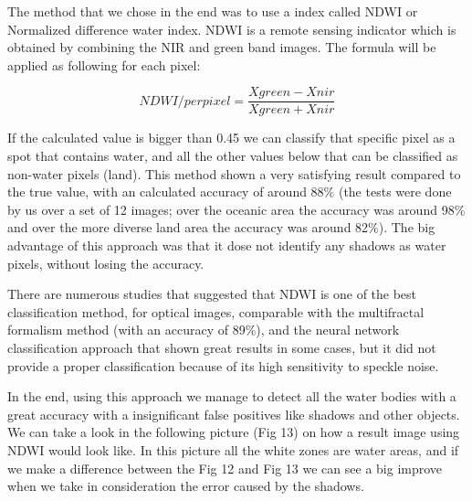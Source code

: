 \documentclass[12pt, a4paper]{report}
\begin{document}
The method that we chose in the end was to use a index called NDWI or Normalized difference water index. NDWI is a remote sensing indicator which is obtained by combining the NIR and green band images. The formula will be applied as following for each pixel:

$$ NDWI/perpixel = \frac{Xgreen - Xnir}{Xgreen + Xnir}$$

If the calculated value is bigger than 0.45 we can classify that specific pixel as a spot that contains water, and all the other values below that can be classified as non-water pixels (land). This method shown a very satisfying result compared to the true value, with an calculated accuracy of around 88\% (the tests were done by us over a set of 12 images; over the oceanic area the accuracy was around 98\% and over the more diverse land area the accuracy was around 82\%). The big advantage of this approach was that it dose not identify any shadows as water pixels, without losing the accuracy. 
\par 
There are numerous studies \cite{NDWI, NDWI Comparison} that suggested that NDWI is one of the best classification method, for optical images, comparable with the multifractal formalism method (with an accuracy of 89\%), and the neural network classification approach that shown great results in some cases, but it did not provide a proper classification because of its high sensitivity to speckle noise.
\par 

In the end, using this approach we manage to detect all the water bodies with a great accuracy with a insignificant false positives like shadows and other objects. We can take a look in the following picture (Fig 13) on how a result image using NDWI would look like. In this picture all the white zones are water areas, and if we make a difference between the Fig 12 and Fig 13 we can see a big improve when we take in consideration the error caused by the shadows.
\par 
\end{document}
